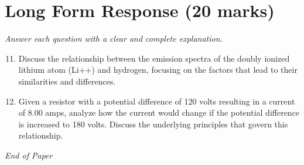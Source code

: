 \documentclass[12pt]{article}
\begin{document}
\section*{Long Form Response (20 marks)}
\textit{Answer each question with a clear and complete explanation.}
\begin{enumerate}[label=\arabic*.]
\setcounter{enumi}{10}
\item Discuss the relationship between the emission spectra of the doubly ionized lithium atom (Li++) and hydrogen, focusing on the factors that lead to their similarities and differences.
\item Given a resistor with a potential difference of 120 volts resulting in a current of 8.00 amps, analyze how the current would change if the potential difference is increased to 180 volts. Discuss the underlying principles that govern this relationship.
\end{enumerate}

\vfill
\noindent\textit{End of Paper}
\end{document}
